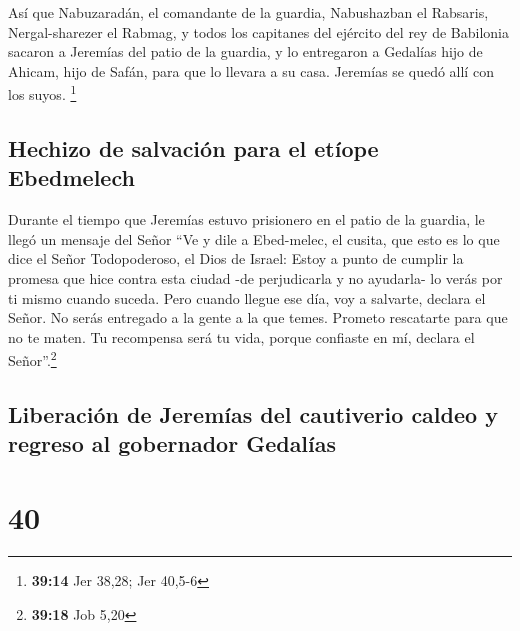  Así que Nabuzaradán, el comandante de la guardia,
Nabushazban el Rabsaris, Nergal-sharezer el Rabmag, y todos los
capitanes del ejército del rey de Babilonia  sacaron a
Jeremías del patio de la guardia, y lo entregaron a Gedalías hijo de
Ahicam, hijo de Safán, para que lo llevara a su casa. Jeremías se quedó
allí con los suyos. \footnote{\textbf{39:14} Jer 38,28; Jer 40,5-6}

\hypertarget{hechizo-de-salvaciuxf3n-para-el-etuxedope-ebedmelech}{%
\subsection{Hechizo de salvación para el etíope
Ebedmelech}\label{hechizo-de-salvaciuxf3n-para-el-etuxedope-ebedmelech}}

 Durante el tiempo que Jeremías estuvo prisionero en el
patio de la guardia, le llegó un mensaje del Señor  ``Ve
y dile a Ebed-melec, el cusita, que esto es lo que dice el Señor
Todopoderoso, el Dios de Israel: Estoy a punto de cumplir la promesa que
hice contra esta ciudad -de perjudicarla y no ayudarla- lo verás por ti
mismo cuando suceda.  Pero cuando llegue ese día, voy a
salvarte, declara el Señor. No serás entregado a la gente a la que
temes.  Prometo rescatarte para que no te maten. Tu
recompensa será tu vida, porque confiaste en mí, declara el
Señor''.\footnote{\textbf{39:18} Job 5,20}

\hypertarget{liberaciuxf3n-de-jeremuxedas-del-cautiverio-caldeo-y-regreso-al-gobernador-gedaluxedas}{%
\subsection{Liberación de Jeremías del cautiverio caldeo y regreso al
gobernador
Gedalías}\label{liberaciuxf3n-de-jeremuxedas-del-cautiverio-caldeo-y-regreso-al-gobernador-gedaluxedas}}

\hypertarget{section-39}{%
\section{40}\label{section-39}}

